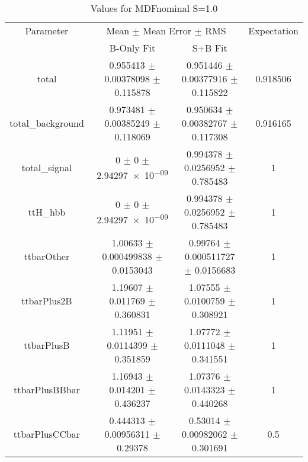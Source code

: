 \begin{table}
\centering
\caption{Values for MDFnominal S=1.0}
\begin{tabular}{cccc}
\toprule
Parameter & \multicolumn{2}{c}{Mean $\pm$ Mean Error $\pm$ RMS} & Expectation\\
 & B-Only Fit & S+B Fit & \\
\midrule
total & \num{0.955413} $\pm$ \num{0.00378098} $\pm$ \num{0.115878} & \num{0.951446} $\pm$ \num{0.00377916} $\pm$ \num{0.115822} & \num{0.918506}\\
total\_background & \num{0.973481} $\pm$ \num{0.00385249} $\pm$ \num{0.118069} & \num{0.950634} $\pm$ \num{0.00382767} $\pm$ \num{0.117308} & \num{0.916165}\\
total\_signal & \num{0} $\pm$ \num{0} $\pm$ \num{2.94297e-09} & \num{0.994378} $\pm$ \num{0.0256952} $\pm$ \num{0.785483} & \num{1}\\
ttH\_hbb & \num{0} $\pm$ \num{0} $\pm$ \num{2.94297e-09} & \num{0.994378} $\pm$ \num{0.0256952} $\pm$ \num{0.785483} & \num{1}\\
ttbarOther & \num{1.00633} $\pm$ \num{0.000499838} $\pm$ \num{0.0153043} & \num{0.99764} $\pm$ \num{0.000511727} $\pm$ \num{0.0156683} & \num{1}\\
ttbarPlus2B & \num{1.19607} $\pm$ \num{0.011769} $\pm$ \num{0.360831} & \num{1.07555} $\pm$ \num{0.0100759} $\pm$ \num{0.308921} & \num{1}\\
ttbarPlusB & \num{1.11951} $\pm$ \num{0.0114399} $\pm$ \num{0.351859} & \num{1.07772} $\pm$ \num{0.0111048} $\pm$ \num{0.341551} & \num{1}\\
ttbarPlusBBbar & \num{1.16943} $\pm$ \num{0.014201} $\pm$ \num{0.436237} & \num{1.07376} $\pm$ \num{0.0143323} $\pm$ \num{0.440268} & \num{1}\\
ttbarPlusCCbar & \num{0.444313} $\pm$ \num{0.00956311} $\pm$ \num{0.29378} & \num{0.53014} $\pm$ \num{0.00982062} $\pm$ \num{0.301691} & \num{0.5}\\
\bottomrule
\end{tabular}
\end{table}